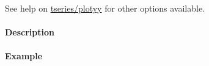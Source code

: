  See help on \url{tseries/plotyy} for other options available.
 
 \paragraph{Description}
 
 \paragraph{Example}


